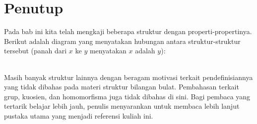 	\section{Penutup}
	Pada bab ini kita telah mengkaji beberapa struktur dengan properti-propertinya. Berikut adalah diagram yang menyatakan hubungan antara struktur-struktur tersebut (panah dari $x$ ke $y$ menyatakan $x$ adalah $y$):\\
	
	\\
	
	Masih banyak struktur lainnya dengan beragam motivasi terkait pendefinisiannya yang tidak dibahas pada materi struktur bilangan bulat. Pembahasan terkait grup, kuosien, dan homomorfisma juga tidak dibahas di sini. Bagi pembaca yang tertarik belajar lebih jauh, penulis menyarankan untuk membaca lebih lanjut pustaka utama yang menjadi referensi kuliah ini.
	